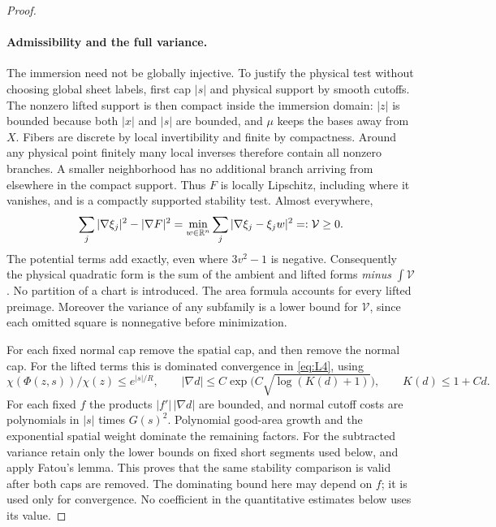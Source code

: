 \begin{proof}
\paragraph{Admissibility and the full variance.}
The immersion need not be globally injective.  To justify the physical
test without choosing global sheet labels, first cap
$|s|$ and physical support by smooth cutoffs.  The nonzero lifted support
is then compact inside the immersion domain: $|z|$ is bounded because
both $|x|$ and $|s|$ are bounded, and $\mu$ keeps the bases away from
$X$.  Fibers are discrete by local invertibility and finite by
compactness.  Around any physical point finitely many local inverses
therefore contain all nonzero branches.  A smaller neighborhood has no
additional branch arriving from elsewhere in the compact support.
Thus $F$ is locally Lipschitz, including where it vanishes, and is a
compactly supported stability test.  Almost everywhere,
\begin{equation}\label{eq:growth-variance}
 \sum_j|\nabla\xi_j|^2-|\nabla F|^2
 =\min_{w\in\mathbb R^n}\sum_j|\nabla\xi_j-\xi_jw|^2
 =:\mathcal V\ge0.
\end{equation}
The potential terms add exactly, even where $3v^2-1$ is negative.
Consequently the physical quadratic form is the sum of the ambient and
lifted forms \emph{minus} $\int\mathcal V$.  No partition of a chart is
introduced.  The area formula accounts for every lifted preimage.
Moreover the variance of any subfamily is a lower bound for
$\mathcal V$, since each omitted square is nonnegative before
minimization.

For each fixed normal cap remove the spatial cap, and then remove the
normal cap.  For the lifted terms this is dominated convergence in
\eqref{eq:L4}, using
\[
 \chi(\Phi(z,s))/\chi(z)\le e^{|s|/R},\qquad
 |\nabla d|\le C\exp\bigl(C\sqrt{\log(K(d)+1)}\bigr),\qquad
 K(d)\le1+Cd.
\]
For each fixed $f$ the products $|f'|\,|\nabla d|$ are bounded, and normal cutoff costs are
polynomials in $|s|$ times $G(s)^2$.  Polynomial good-area growth and
the exponential spatial weight dominate the remaining factors.
For the subtracted variance retain only the lower bounds on fixed
short segments used below, and apply Fatou's lemma.  This proves that
the same stability comparison is valid after both caps are removed.
The dominating bound here may depend on $f$; it is used only for
convergence.  No coefficient in the quantitative estimates below uses
its value.


\end{proof}
